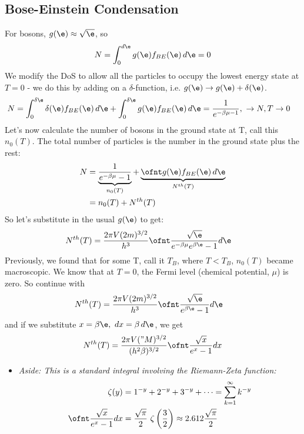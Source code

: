 \documentclass[a4paper, 11pt, normalem]{report}
\begin{document}
\chapter{}
\section{Bose-Einstein Condensation}
For bosons, $g(\e) \approx \sqrt{\e}$, so
\begin{equation}
    N = \int_0^{d\e} g(\e)f_{BE}(\e)\,d\e = 0
\end{equation}
We modify the DoS to allow all the particles to occupy the lowest energy state at $T=0$ - we do this by adding on a $\delta$-function, i.e. $g(\e) \to g(\e) + \delta(\e)$.
\begin{align}
    N = \int_0^{\delta\e} \delta(\e)f_{BE}(\e)\,d\e + \int_0^{\delta\e} g(\e)f_{BE}(\e)\,d\e &= \frac{1}{e^{-\beta\mu - 1}},~ \to N, T \to 0
\end{align}
Let's now calculate the number of bosons in the ground state at T, call this $n_0(T)$.
The total number of particles is the number in the ground state plus the rest:
\begin{align}
    N &= \underbrace{\frac{1}{e^{-\beta\mu}-1}}_{n_0(T)} + \underbrace{\ofnt g(\e)f_{BE}(\e)\,d\e}_{N^{th}(T)} \\ 
      &= n_0(T) + N^{th}(T)
\end{align}
So let's substitute in the usual $g(\e)$ to get:
\begin{align}
    N^{th}(T) &= \frac{2\pi V(2m)^{3/2}}{h^3} \ofnt \frac{\sqrt{\e}}{e^{-\beta\mu}e^{\beta\e}-1}d\e
\end{align}
Previously, we found that for some T, call it $T_B$, where $T<T_B$, $n_0(T)$ became macroscopic.
We know that at $T=0$, the Fermi level (chemical potential, $\mu$) is zero.
So continue with
\begin{align}
    N^{th}(T) &= \frac{2\pi V(2m)^{3/2}}{h^3} \ofnt \frac{\sqrt{\e}}{e^{\beta\e}-1}d\e
\end{align}
and if we substitute $x = \beta\e,~ dx = \beta\,d\e$, we get
\begin{align}
    N^{th}(T) &= \frac{2\pi V("M)^{3/2}}{(h^2\beta)^{3/2}} \ofnt \frac{\sqrt{x}}{e^x - 1}dx \\
\end{align}
\begin{itemize}
    \item \emph{Aside: This is a standard integral involving the Riemann-Zeta function:}
        \begin{align}
            \zeta(y) &= 1^{-y} + 2^{-y} + 3^{-y} + \cdots = \sum_{k=1}^\infty k^{-y} \\
            \ofnt \frac{\sqrt{x}}{e^x -1}dx &= \frac{\sqrt{\pi}}{2} ~\zeta\left(\frac{3}{2}\right) \approx 2.612\frac{\sqrt{\pi}}{2}
        \end{align}
\end{itemize}
\end{document}
